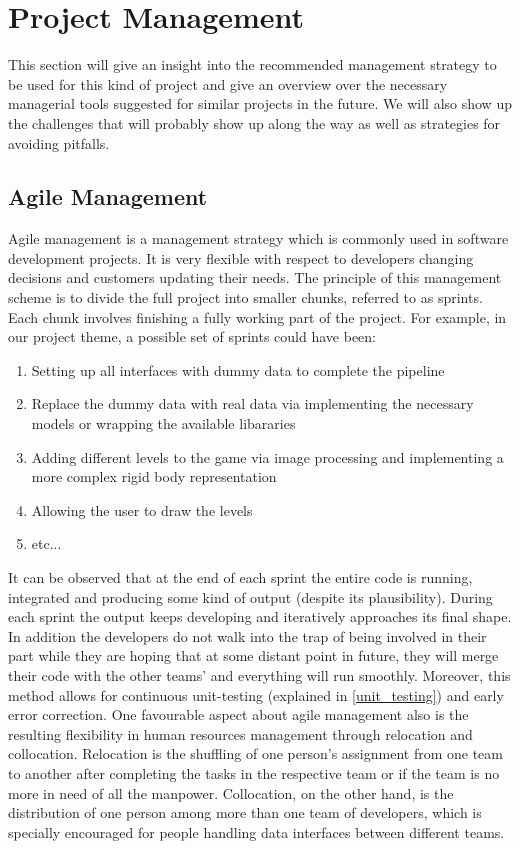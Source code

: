 \section{Project Management}
This section will give an insight into the recommended management strategy to be used for this kind of project and give an overview over the necessary managerial tools suggested for similar projects in the future.
We will also show up the challenges that will probably show up along the way as well as strategies for avoiding pitfalls.

\subsection{Agile Management}
Agile management is a management strategy which is commonly used in software development projects. It is very flexible with respect to developers changing decisions and customers updating their needs. The principle of this management scheme is to divide the full project into smaller chunks, referred to as sprints. Each chunk involves finishing a fully working part of the project. For example, in our project theme, a possible set of sprints could have been:
\begin{enumerate}
  \item{Setting up all interfaces with dummy data to complete the pipeline}
  \item{Replace the dummy data with real data via implementing the necessary models or wrapping the available libararies}
  \item{Adding different levels to the game via image processing and implementing a more complex rigid body representation}
  \item{Allowing the user to draw the levels}
  \item{etc...}
\end{enumerate}
It can be observed that at the end of each sprint the entire code is running, integrated and producing some kind of output (despite its 	plausibility). During each sprint the output keeps developing and iteratively approaches its final shape. In addition the developers do not walk into the trap of being involved in their part while they are hoping that at some distant point in future, they will merge their code with the other teams' and everything will run smoothly. Moreover, this method allows for continuous unit-testing (explained in \autoref{unit_testing}) and early error correction.
One favourable aspect about agile management also is the resulting flexibility in human resources management through relocation and collocation. Relocation is the shuffling of one person's assignment from one team to another after completing the tasks in the respective team or if the team is no more in need of all the manpower. Collocation, on the other hand, is the distribution of one person among more than one team of developers, which is specially encouraged for people handling data interfaces between different teams.

